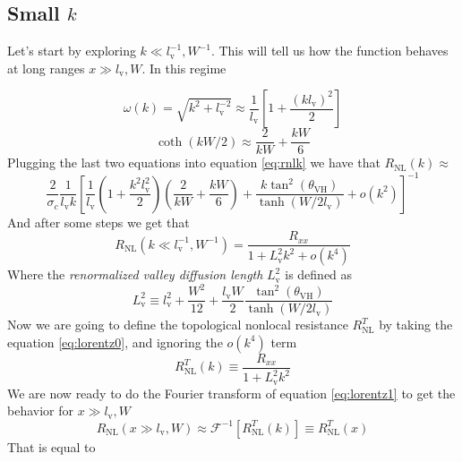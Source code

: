 \subsection{Small $k$}
Let's start by exploring $k\ll l_\textrm{v}^{-1},W^{-1}$. This will tell us how the function behaves at long ranges $x\gg l_\textrm{v},W$. In this regime 

\begin{equation}
    \omega(k)=\sqrt{k^2+l_\textrm{v}^{-2}}\approx \frac 1{l_\textrm{v}}\left[1+\frac{(kl_\textrm{v})^2}2\right]
\end{equation}
\begin{equation}
    \coth (kW/2)\approx \frac 2{kW} + \frac{kW}6
\end{equation}
Plugging the last two equations into equation \ref{eq:rnlk} we have that $R_{\textrm{NL}}(k)\approx$
\begin{equation}
    \frac 2{\sigma_c}\frac 1 {l_\textrm{v}k}\left[
        \frac 1{l_\textrm{v}}\left(1+\frac{k^2l_\textrm{v}^2}{2}\right)\left(\frac 2{kW} + \frac{kW}6\right)+
        \frac{k\tan^2(\theta_{\textrm{VH}})}{\tanh(W/2l_\textrm{v})} + o(k^2)
    \right]^{-1}
\end{equation}
And after some steps we get that
\begin{equation}
    R_{\textrm{NL}}(k\ll l_\textrm{v}^{-1},W^{-1})=
    \frac {R_{xx}}{1+L_\textrm{v}^2k^2 + o(k^4)}
    \label{eq:lorentz0}
\end{equation}
Where the \textit{renormalized valley diffusion length} $L_\textrm{v}^2$ is defined as
\begin{equation}
    L_\textrm{v}^2 \equiv l_\textrm{v}^2+\frac {W^2}{12} +\frac{l_\textrm{v}W}2 \frac{\tan^2(\theta_{\textrm{VH}})}{\tanh(W/2l_\textrm{v})}
\end{equation}
Now we are going to define the topological nonlocal resistance $R_{\textrm{NL}}^T$ by taking the equation \ref{eq:lorentz0}, and ignoring the $o(k^4)$ term
\begin{equation}
    R_{\textrm{NL}}^T(k)\equiv
    \frac {R_{xx}}{1+L_\textrm{v}^2k^2}
    \label{eq:lorentz1}
\end{equation} 
We are now ready to do the Fourier transform of equation \ref{eq:lorentz1} to get the behavior for $x\gg l_\textrm{v},W$
\begin{equation}
    R_{\textrm{NL}}(x\gg l_\textrm{v},W)\approx\mathcal F^{-1}\left[R_{\textrm{NL}}^T(k)\right]\equiv R_{\textrm{NL}}^T(x)
\end{equation}
That is equal to 

